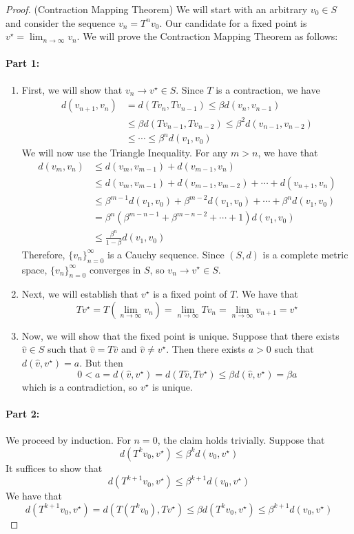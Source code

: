 \documentclass[10pt]{article}
\begin{document}
\begin{proof}
	(Contraction Mapping Theorem) We will start with an arbitrary $v_0 \in S$ and consider the sequence $v_n = T^n v_0$. Our candidate for a fixed point is $v^\star = \lim_{n\to\infty} v_n$. We will prove the Contraction Mapping Theorem as follows:
	\paragraph{Part 1:}
	\begin{enumerate}
		\item First, we will show that $v_n \to v^\star \in S$. Since $T$ is a contraction, we have
		\begin{align*}
			d(v_{n+1},v_n) &= d(Tv_n,Tv_{n-1}) \le \beta d(v_n,v_{n-1}) \\
			&\le \beta d(Tv_{n-1},Tv_{n-2}) \le \beta^2 d(v_{n-1},v_{n-2}) \\
			&\le \cdots \le \beta^n d(v_1,v_0)
		\end{align*}
		We will now use the Triangle Inequality. For any $m > n$, we have that
		\begin{align*}
			d(v_m,v_n) &\le d(v_m,v_{m-1}) + d(v_{m-1},v_n) \\
			&\le d(v_m,v_{m-1}) + d(v_{m-1},v_{m-2}) + \cdots + d(v_{n+1},v_n) \\
			&\le \beta^{m-1} d(v_1,v_0) + \beta^{m-2} d(v_1,v_0) + \cdots + \beta^n d(v_1,v_0) \\
			&= \beta^n (\beta^{m-n-1} + \beta^{m - n - 2} + \cdots + 1) d(v_1,v_0) \\
			&\le \frac{\beta^n}{1 - \beta} d(v_1,v_0)
		\end{align*}
		Therefore, $\{v_n\}_{n=0}^\infty $ is a Cauchy sequence. Since $(S,d)$ is a complete metric space, $\{v_n\}_{n=0}^\infty$ converges in $S$, so $v_n \to v^\star \in S$.
		\item Next, we will establish that $v^\star$ is a fixed point of $T$. We have that
		\[
		Tv^\star = T(\lim_{n\to\infty} v_n) = \lim_{n\to\infty} Tv_n = \lim_{n\to\infty} v_{n+1} = v^\star
		\]
		\item Now, we will show that the fixed point is unique. Suppose that there exists $\hat{v} \in S$ such that $\hat{v} = T\hat{v}$ and $\hat{v} \ne v^\star$. Then there exists $a > 0$ such that $d(\hat{v},v^\star) = a$. But then
		\[
		0 < a = d(\hat{v},v^\star) = d(T\hat{v} , Tv^\star) \le \beta d(\hat{v},v^\star) = \beta a
		\]
		which is a contradiction, so $v^\star$ is unique.
	\end{enumerate}
	
	\paragraph{Part 2:} We proceed by induction. For $n = 0$, the claim holds trivially. Suppose that
	\[
	d(T^k v_0, v^\star) \le \beta^k d(v_0,v^\star)
	\]
	It suffices to show that
	\[
	d(T^{k+1} v_0, v^\star) \le \beta^{k+1} d(v_0,v^\star)
	\]
	We have that
	\[
	d(T^{k+1} v_0, v^\star) = d(T(T^k v_0) , Tv^\star) \le \beta d(T^k v_0, v^\star) \le \beta^{k+1} d(v_0,v^\star)
	\]
\end{proof}
\end{document}

